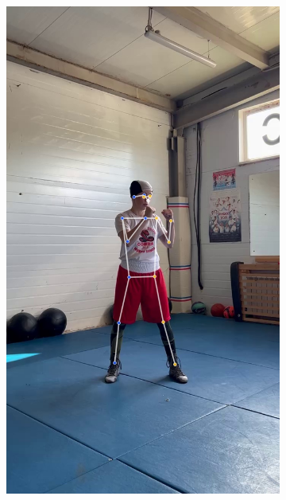 \begin{figure}[h]
\begin{subfigure}[b]{0.24\textwidth}
	\centering
	\includegraphics[width=\textwidth]{./images/data_info/box_examples/ex_5}
\end{subfigure}
\begin{subfigure}[b]{0.24\textwidth}
	\centering

\end{subfigure}
\end{figure}
